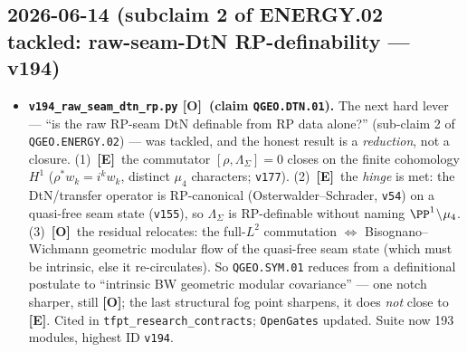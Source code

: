 \documentclass[11pt]{article}
\providecommand{\mE}{\textbf{[E]}}\providecommand{\mC}{\textbf{[C]}}
\providecommand{\mO}{\textbf{[O]}}\providecommand{\mX}{\textbf{[X]}}
\providecommand{\vref}[1]{\texttt{#1}}
\begin{document}
\subsection*{2026-06-14 (subclaim 2 of ENERGY.02 tackled: raw-seam-DtN RP-definability --- v194)}
\begin{itemize}
\item \textbf{\texttt{v194\_raw\_seam\_dtn\_rp.py} \mO\ (claim \texttt{QGEO.DTN.01}).} The next hard lever ---
  ``is the raw RP-seam DtN definable from RP data alone?'' (sub-claim 2 of \texttt{QGEO.ENERGY.02}) --- was
  tackled, and the honest result is a \emph{reduction}, not a closure. (1)~\mE\ the commutator
  $[\rho,\Lambda_\Sigma]=0$ closes on the finite cohomology $H^1$ ($\rho^*w_k=i^k w_k$, distinct $\mu_4$
  characters; \vref{v177}). (2)~\mE\ the \emph{hinge} is met: the DtN/transfer operator is RP-canonical
  (Osterwalder--Schrader, \vref{v54}) on a quasi-free seam state (\vref{v155}), so $\Lambda_\Sigma$ is
  RP-definable without naming $\PP^1\!\setminus\!\mu_4$. (3)~\mO\ the residual relocates: the full-$L^2$
  commutation $\Leftrightarrow$ Bisognano--Wichmann geometric modular flow of the quasi-free seam state
  (which must be intrinsic, else it re-circulates). So \texttt{QGEO.SYM.01} reduces from a definitional
  postulate to ``intrinsic BW geometric modular covariance'' --- one notch sharper, still \mO; the last
  structural fog point sharpens, it does \emph{not} close to \mE. Cited in
  \texttt{tfpt\_research\_contracts}; \texttt{OpenGates} updated. Suite now 193 modules, highest ID
  \texttt{v194}.
\end{itemize}
\end{document}
